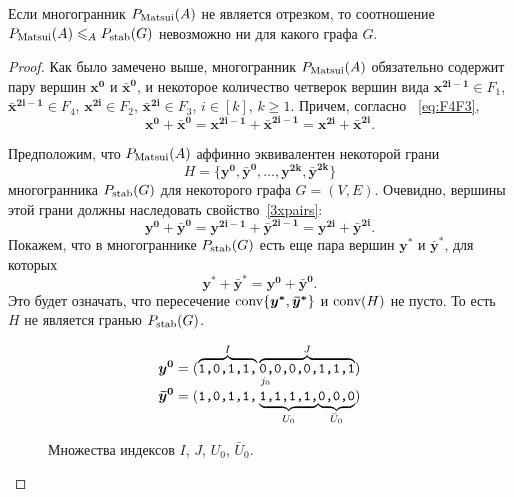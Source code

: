 \begin{theorem}\label{thm:DCPStable}
Если многогранник $P_{\textup{Matsui}}(A)$ не является отрезком, то соотношение $P_{\textup{Matsui}}(A) \leqslant_A P_{\textup{stab}}(G)$ невозможно ни для какого графа $G$.
\end{theorem}
\begin{proof}
Как было замечено выше, многогранник $P_{\textup{Matsui}}(A)$ обязательно содержит пару вершин $\bm{x^0}$ и $\bm{\bar{x}^0}$, и некоторое количество 
четверок вершин вида $\bm{x^{2i-1}} \in F_1$, $\bm{\bar{x}^{2i-1}} \in F_4$, $\bm{x^{2i}} \in F_2$, $\bm{\bar{x}^{2i}} \in F_3$, $i\in [k]$, $k \ge 1$.
Причем, согласно~ \eqref{eq:F4F3},
\begin{equation}
\label{3xpairs}
\bm{x^0} + \bm{\bar{x}^0} = \bm{x^{2i-1}} + \bm{\bar{x}^{2i-1}} = \bm{x^{2i}} + \bm{\bar{x}^{2i}}.
\end{equation}

Предположим, что $P_{\textup{Matsui}}(A)$ аффинно эквивалентен некоторой грани 
\[
H = \{\bm{y^0}, \bm{\bar{y}^0}, \ldots, \bm{y^{2k}}, \bm{\bar{y}^{2k}}\}
\] 
многогранника $P_{\textup{stab}}(G)$ для некоторого графа $G = (V,E)$.
Очевидно, вершины этой грани должны наследовать свойство~\eqref{3xpairs}:
\begin{equation}
\label{3pairs}
\bm{y^0} + \bm{\bar{y}^0} = \bm{y^{2i-1}} + \bm{\bar{y}^{2i-1}} = \bm{y^{2i}} + \bm{\bar{y}^{2i}}.
\end{equation}
Покажем, что в многограннике $P_{\textup{stab}}(G)$ есть еще пара вершин $\bm{y^*}$ и $\bm{\bar{y}^*}$, для которых
\begin{equation}
\label{ThGoal}
\bm{y^*} + \bm{\bar{y}^*} = \bm{y^0} + \bm{\bar{y}^0}.
\end{equation}
Это будет означать, что пересечение $\operatorname{conv}\{\bm{y^*}, \bm{\bar{y}^*}\}$ и $\operatorname{conv}(H)$ не пусто.
То есть $H$ не является гранью $P_{\textup{stab}}(G)$.

\begin{figure}[hb]
	\[
	\begin{aligned}
	\bm{y^0}&=(\overbrace{\text{\texttt{1,0,1,1,}}}^{I}
	\overbrace{\text{\texttt{0,0,0,0,1,1,1}}}^{J})\\[-1.0ex]
	&\phantom{=(\text{\texttt{1,0,1,1, }}}^{j_0} \\[-2.0ex]
	\bm{\bar{y}^0}&=(\text{\texttt{1,0,1,1,}}
	\underbrace{\text{\texttt{1,1,1,1,}}}_{U_0\vphantom{\bar{U}_0}}\!
	\underbrace{\text{\texttt{0,0,0}}}_{\bar{U}_0})
	\end{aligned}
	\]
	\caption{Множества индексов $I$, $J$, $U_0$, $\bar{U}_0$.}
	\label{fig:IJU}
\end{figure}


\end{proof}
